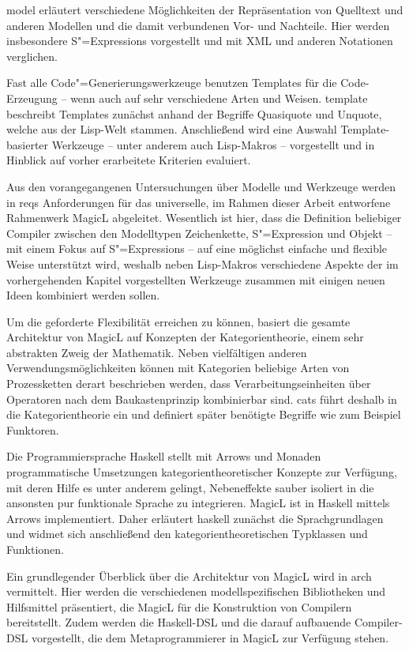 \documentclass[12pt, a4paper, bibgerm]{scrbook}
\newcommand\cref{}
\newcommand{\sexp}{S"=Expression}
\newcommand{\sexps}{S"=Expressions}
\newcommand{\cgen}{Code"=Generierung}
\begin{document}
\cref{model} erläutert verschiedene Möglichkeiten der Repräsentation von
Quelltext und anderen Modellen und die damit verbundenen Vor- und
Nachteile. Hier werden insbesondere \sexps{} vorgestellt und mit XML und
anderen Notationen verglichen.

Fast alle \cgen{}swerkzeuge benutzen Templates für die
Code-Erzeugung -- wenn auch auf sehr verschiedene Arten und
Weisen. \cref{template} beschreibt Templates zunächst anhand der
Begriffe Quasiquote und Unquote, welche aus der Lisp-Welt
stammen. Anschließend wird eine Auswahl Template-basierter Werkzeuge --
unter anderem auch Lisp-Makros -- vorgestellt und in Hinblick auf vorher
erarbeitete Kriterien evaluiert.

Aus den vorangegangenen Untersuchungen über Modelle und Werkzeuge werden
in \cref{reqs} Anforderungen für das universelle, im Rahmen dieser
Arbeit entworfene Rahmenwerk MagicL abgeleitet. Wesentlich ist hier,
dass die Definition beliebiger Compiler zwischen den Modelltypen
Zeichenkette, \sexp{} und Objekt -- mit einem Fokus auf \sexps{} -- auf
eine möglichst einfache und flexible Weise unterstützt wird, weshalb
neben Lisp-Makros verschiedene Aspekte der im vorhergehenden Kapitel
vorgestellten Werkzeuge zusammen mit einigen neuen Ideen kombiniert
werden sollen.

Um die geforderte Flexibilität erreichen zu können, basiert die
gesamte Architektur von MagicL auf Konzepten der Kategorientheorie,
einem sehr abstrakten Zweig der Mathematik. Neben vielfältigen anderen
Verwendungsmöglichkeiten können mit Kategorien beliebige Arten von
Prozessketten derart beschrieben werden, dass Verarbeitungseinheiten
über Operatoren nach dem Baukastenprinzip kombinierbar sind. \cref{cats}
führt deshalb in die Kategorientheorie ein und definiert später
benötigte Begriffe wie zum Beispiel Funktoren.

Die Programmiersprache Haskell stellt mit Arrows und
Monaden programmatische Umsetzungen kategorientheoretischer
Konzepte zur Verfügung, mit deren Hilfe es unter anderem gelingt,
Nebeneffekte sauber isoliert in die ansonsten pur funktionale Sprache zu
integrieren. MagicL ist in Haskell mittels Arrows implementiert. Daher
erläutert \cref{haskell} zunächst die Sprachgrundlagen und widmet sich
anschließend den kategorientheoretischen Typklassen und Funktionen.

Ein grundlegender Überblick über die Architektur von MagicL wird in
\cref{arch} vermittelt. Hier werden die verschiedenen modellspezifischen
Bibliotheken und Hilfsmittel präsentiert, die MagicL für die
Konstruktion von Compilern bereitstellt. Zudem werden die Haskell-DSL
und die darauf aufbauende Compiler-DSL vorgestellt, die dem
Metaprogrammierer in MagicL zur Verfügung stehen.
\end{document}
